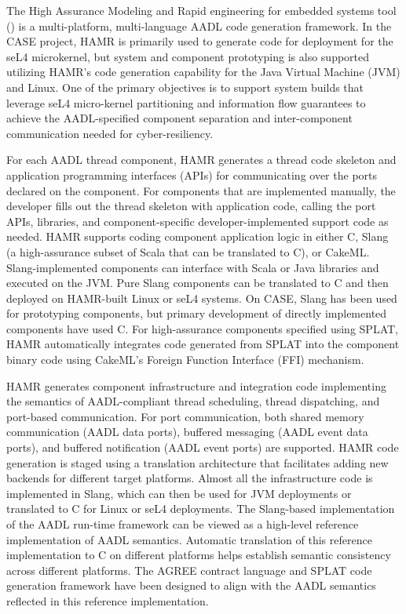 
The High Assurance Modeling and
Rapid engineering for embedded systems tool (\hamr)
\cite{hamr} is a multi-platform, multi-language
AADL code generation framework.  In the CASE project, HAMR is primarily used
to generate code for deployment for the seL4 microkernel, but system and component
prototyping is also supported utilizing HAMR's code generation capability
for the Java Virtual Machine (JVM) and Linux.  One of the
primary objectives is to support system builds that
leverage seL4 micro-kernel partitioning and information flow
guarantees to achieve the AADL-specified component separation and
inter-component communication needed for cyber-resiliency.

For each AADL thread component, HAMR generates a thread code
skeleton and application programming interfaces (APIs) for communicating over the ports declared on
the component.  For components that are implemented manually, the
developer fills out the thread skeleton with application code,
calling the port APIs, libraries, and component-specific
developer-implemented support code as needed.
HAMR supports coding component application logic in either C,
Slang~\cite{slang} (a high-assurance subset of Scala that can be translated to
C), or CakeML.  Slang-implemented components can interface with
Scala or Java libraries and executed on the JVM.  Pure Slang
components can be translated to C and then deployed on HAMR-built
Linux or seL4 systems.  On CASE, Slang has been used for prototyping
components, but primary development of directly implemented
components have used C.  For high-assurance components specified
using SPLAT, HAMR automatically integrates code generated from
SPLAT into the component binary code using CakeML's Foreign
Function Interface (FFI) mechanism.

HAMR generates component infrastructure and integration code
implementing the semantics of AADL-compliant thread scheduling,
thread dispatching, and port-based communication.
For port communication, both shared memory communication (AADL
data ports), buffered messaging (AADL event data ports), and
buffered notification (AADL event ports) are supported.
HAMR code generation is staged using a translation architecture
that facilitates adding new backends for different target
platforms.   Almost all the infrastructure code is implemented
in Slang, which can then be used for JVM deployments or
translated to C for Linux or seL4 deployments.
The Slang-based implementation of the AADL run-time framework
can be viewed as a high-level reference implementation of AADL
semantics.   Automatic translation of this reference
implementation to C on different platforms helps establish
semantic consistency across different platforms. 
The AGREE contract language and SPLAT
code generation framework have been designed to align with the AADL
semantics reflected in this reference implementation.  

